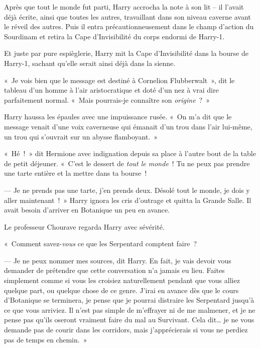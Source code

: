 Après que tout le monde fut parti, Harry accrocha la note à son lit -- il l'avait déjà écrite, ainsi que toutes les autres, travaillant dans son niveau caverne avant le réveil des autres. Puis il entra précautionneusement dans le champ d'action du Sourdinam et retira la Cape d'Invisibilité du corps endormi de Harry-1.

Et juste par pure espièglerie, Harry mit la Cape d'Invisibilité dans la bourse de Harry-1, sachant qu'elle serait ainsi déjà dans la sienne.

\later

«~Je vois bien que le message est destiné à Cornelion Flubberwalt~», dit le tableau d'un homme à l'air aristocratique et doté d'un nez à vrai dire parfaitement normal. «~Mais pourrais-je connaître son \emph{origine}~?~»

Harry haussa les épaules avec une impuissance rusée. «~On m'a dit que le message venait d'une voix caverneuse qui émanait d'un trou dans l'air lui-même, un trou qui s'ouvrait sur un abysse flamboyant.~»

\later

«~Hé~!~» dit Hermione avec indignation depuis sa place à l'autre bout de la table de petit déjeuner. «~C'est le dessert de \emph{tout le monde}~! Tu ne peux pas prendre une tarte entière et la mettre dans ta bourse~!

--- Je ne prends pas une tarte, j'en prends deux. Désolé tout le monde, je dois y aller maintenant~!~» Harry ignora les cris d'outrage et quitta la Grande Salle. Il avait besoin d'arriver en Botanique un peu en avance.

\later

Le professeur Chourave regarda Harry avec sévérité.

«~Comment savez-\emph{vous} ce que les Serpentard comptent faire~?

--- Je ne peux nommer mes sources, dit Harry. En fait, je vais devoir vous demander de prétendre que cette conversation n'a jamais eu lieu. Faites simplement comme si vous les croisiez naturellement pendant que vous alliez quelque part, ou quelque chose de ce genre. J'irai en avance dès que le cours d'Botanique se terminera, je pense que je pourrai distraire les Serpentard jusqu'à ce que vous arriviez. Il n'est pas simple de m'effrayer ni de me malmener, et je ne pense pas qu'ils oseront vraiment faire du mal au Survivant. Cela dit… je ne vous demande pas de courir dans les corridors, mais j'apprécierais si vous ne perdiez pas de temps en chemin.~»

